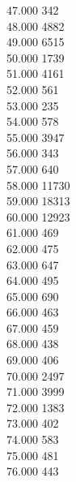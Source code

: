 { 47.000	342 \\
 48.000	4882 \\
 49.000	6515 \\
 50.000	1739 \\
 51.000	4161 \\
 52.000	561 \\
 53.000	235 \\
 54.000	578 \\
 55.000	3947 \\
 56.000	343 \\
 57.000	640 \\
 58.000	11730 \\
 59.000	18313 \\
 60.000	12923 \\
 61.000	469 \\
 62.000	475 \\
 63.000	647 \\
 64.000	495 \\
 65.000	690 \\
 66.000	463 \\
 67.000	459 \\
 68.000	438 \\
 69.000	406 \\
 70.000	2497 \\
 71.000	3999 \\
 72.000	1383 \\
 73.000	402 \\
 74.000	583 \\
 75.000	481 \\
 76.000	443 \\
}
